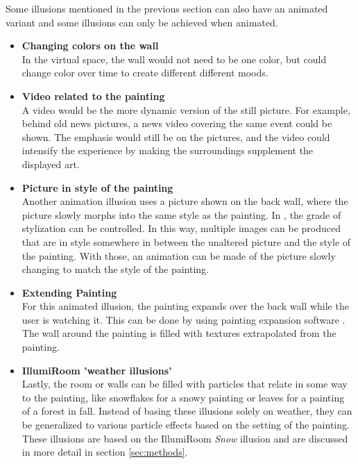\documentclass[a4paper]{article}
\begin{document}
Some illusions mentioned in the previous section can also have an animated variant and some illusions can only be achieved when animated.

\begin{itemize}

\item{\textbf{Changing colors on the wall}}
\\In the virtual space, the wall would not need to be one color, but could change color over time to create different different moods.

\item{\textbf{Video related to the painting}}
\\A video would be the more dynamic version of the still picture. For example, behind old news pictures, a news video covering the same event could be shown. The emphasis would still be on the pictures, and the video could intensify the experience by making the surroundings supplement the displayed art.

\item{\textbf{Picture in style of the painting}}
\\Another animation illusion uses a picture shown on the back wall, where the picture slowly morphs into the same style as the painting. In \cite{gatys}, the grade of stylization can be controlled. In this way, multiple images can be produced that are in style somewhere in between the unaltered picture and the style of the painting. With those, an animation can be made of the picture slowly changing to match the style of the painting.

\item{\textbf{Extending Painting}}
\\For this animated illusion, the painting expands over the back wall while the user is watching it. This can be done by using painting expansion software \cite{inpainting}. The wall around the painting is filled with textures extrapolated from the painting.


\item{\textbf{IllumiRoom 'weather illusions'}}
\\Lastly, the room or walls can be filled with particles that relate in some way to the painting, like snowflakes for a snowy painting or leaves for a painting of a forest in fall. Instead of basing these illusions solely on weather, they can be generalized to various particle effects based on the setting of the painting. These illusions are based on the IllumiRoom \emph{Snow} illusion \cite{illumiroom} and are discussed in more detail in section \ref{sec:methods}.
\end{itemize}
\end{document}
